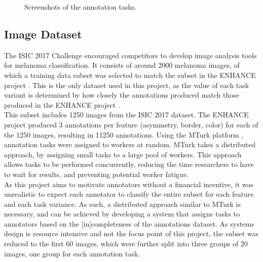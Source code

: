 \documentclass[../report.tex]{subfiles}
\begin{document}
\begin{figure}[t]
\caption{Screenshots of the annotation tasks.}
\label{fig:application}
\end{figure}

\subsection{Image Dataset}

The ISIC 2017 Challenge \cite{ISIC2017Challenge} encouraged competitors to develop image analysis tools for melanoma classification. It consists of around 2000 melanoma images, of which a training data subset was selected to match the subset in the ENHANCE project \cite{Ralf2021ENHANCE}. This is the only dataset used in this project, as the value of each task variant is determined by how closely the annotations produced match those produced in the ENHANCE project \cite{Ralf2021ENHANCE}. \\

This subset includes 1250 images from the ISIC 2017 dataset. The ENHANCE project \cite{Hassenzahl2010Experience} produced 3 annotations per feature (asymmetry, border, color) for each of the 1250 images, resulting in 11250 annotations. Using the MTurk platform \cite{mturk}, annotation tasks were assigned to workers at random. MTurk takes a distributed approach, by assigning small tasks to a large pool of workers. This approach allows tasks to be performed concurrently, reducing the time researchers to have to wait for results, and preventing potential worker fatigue. \\

As this project aims to motivate annotators without a financial incentive, it was unrealistic to expect each annotator to classify the entire subset for each feature and each task variance. As such, a distributed approach similar to MTurk is necessary, and can be achieved by developing a system that assigns tasks to annotators based on the [in]completeness of the annotations dataset. As systems design is resource intensive and not the focus point of this project, the subset was reduced to the first 60 images, which were further split into three groups of 20 images, one group for each annotation task.
\end{document}
